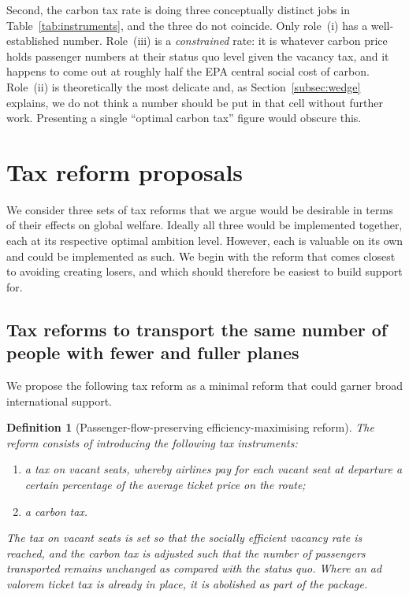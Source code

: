 \documentclass[11pt]{article}
\newtheorem{definition}{Definition}
\begin{document}
Second, the carbon tax rate is doing three conceptually distinct jobs in
Table~\ref{tab:instruments}, and the three do not coincide. Only role~(i) has a
well-established number. Role~(iii) is a \emph{constrained} rate: it is whatever
carbon price holds passenger numbers at their status quo level given the vacancy
tax, and it happens to come out at roughly half the EPA central social cost of
carbon. Role~(ii) is theoretically the most delicate and, as
Section~\ref{subsec:wedge} explains, we do not think a number should be put in
that cell without further work. Presenting a single ``optimal carbon tax''
figure would obscure this.

\section{Tax reform proposals}
\label{sec:instruments}

We consider three sets of tax reforms that we argue would be desirable in terms
of their effects on global welfare. Ideally all three would be implemented
together, each at its respective optimal ambition level. However, each is
valuable on its own and could be implemented as such. We begin with the reform
that comes closest to avoiding creating losers, and which should therefore be
easiest to build support for.

\subsection{Tax reforms to transport the same number of people with fewer and
fuller planes}
\label{subsec:pfp}

We propose the following tax reform as a minimal reform that could garner broad
international support.

\begin{definition}[Passenger-flow-preserving efficiency-maximising reform]
\label{def:pfp}
The reform consists of introducing the following tax instruments:
\begin{enumerate}[label=\arabic*)]
  \item a tax on vacant seats, whereby airlines pay for each vacant seat at
  departure a certain percentage of the average ticket price on the route;
  \item a carbon tax.
\end{enumerate}
The tax on vacant seats is set so that the socially efficient vacancy rate is
reached, and the carbon tax is adjusted such that the number of passengers
transported remains unchanged as compared with the status quo. Where an ad
valorem ticket tax is already in place, it is abolished as part of the package.
\end{definition}
\end{document}
